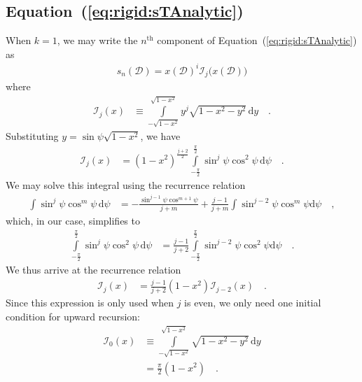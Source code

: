 \documentclass[modern]{aastex62}
\begin{document}
\subsection{Equation~(\ref{eq:rigid:sTAnalytic})}
%
When $k = 1$, we may write the $n^\mathrm{th}$ component
of Equation~(\ref{eq:rigid:sTAnalytic}) as
%
\begin{align}
    s_n(\mathcal{D}) = 
        x(\mathcal{D})^{i}
        \mathcal{I}_{j}\big(x(\mathcal{D})\big)
\end{align}
%
where
%
\begin{align}
    \mathcal{I}_j(x) &\equiv
    \int\limits_{-\sqrt{1-x^2}}^{\sqrt{1-x^2}}
        y^{j}
        \sqrt{1 - x^2 - y^2} \,
    \mathrm{d}y
    \quad.
\end{align}
%
Substituting $y = \sin\psi\sqrt{1 - x^2}$, we have
%
\begin{align}
    \mathcal{I}_j(x) &=
    (1 - x^2)^{\frac{j + 2}{2}}
    \int\limits_{-\frac{\pi}{2}}^{\frac{\pi}{2}}
        \sin^j\psi
        \cos^2\psi \,
    \mathrm{d}\psi
    \quad.
\end{align}
%
We may solve this integral using the recurrence relation
%
\begin{align}
    \int
        \sin^j\psi
        \cos^m\psi \,
    \mathrm{d}\psi
    &=
    -\frac{\sin^{j-1}\psi \cos^{m+1}\psi}{j + m}
    +
    \frac{j - 1}{j + m}\int\sin^{j-2}\psi \cos^m\psi \mathrm{d}\psi
    \quad ,
\end{align}
%
which, in our case, simplifies to
%
\begin{align}
    \int\limits_{-\frac{\pi}{2}}^{\frac{\pi}{2}}
        \sin^j\psi
        \cos^2\psi \,
    \mathrm{d}\psi
    &=
    \frac{j - 1}{j + 2}\int\limits_{-\frac{\pi}{2}}^{\frac{\pi}{2}}\sin^{j-2}\psi \cos^2\psi \mathrm{d}\psi
    \quad.
\end{align}
%
We thus arrive at the recurrence relation
%
\begin{align}
    \label{eq:app:Ij}
    \mathcal{I}_j(x) &=
    \frac{j - 1}{j + 2}
    (1 - x^2)
    \mathcal{I}_{j-2}(x)
    \quad.
\end{align}
%
Since this expression is only used when $j$ is even, we only need one
initial condition for upward recursion:
%
\begin{align}
    \label{eq:app:I0}
    \mathcal{I}_0(x) &\equiv
    \int\limits_{-\sqrt{1-x^2}}^{\sqrt{1-x^2}}
        \sqrt{1 - x^2 - y^2} \,
    \mathrm{d}y
    \nonumber \\
    &= \frac{\pi}{2}(1 - x^2)
    \quad.
\end{align}


\end{document}
